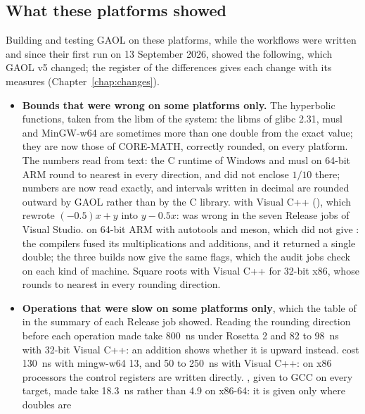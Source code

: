 \documentclass[12pt,a4paper,twoside,openright]{book}
\begin{document}
\endgroup

\subsection{What these platforms showed}\label{sec:ci-showed}

Building and testing GAOL on these platforms, while the workflows were
written and since their first run on 13 September 2026, showed the
following, which GAOL v5 changed; the register of the differences gives each
change with its measures (Chapter~\ref{chap:changes}).

\begin{itemize}
\item[$\bullet$] \textbf{Bounds that were wrong on some platforms only.}
  The hyperbolic functions, taken from the libm of the system: the libms of
  glibc 2.31, musl and MinGW-w64 are sometimes more than one double from the
  exact value; they are now those of CORE-MATH, correctly rounded, on every
  platform.\newinvfive{} The numbers read from text: the C runtime of
  Windows and musl on 64-bit ARM round  to nearest in every
  direction, and  did not enclose $1/10$ there;
  numbers are now read exactly, and intervals written in decimal are
  rounded outward by GAOL rather than by the C library.\newinvfive{}
   with Visual C++ (), which rewrote
  $(-0.5)x+y$ into $y-0.5x$:  was wrong in the
  seven Release jobs of Visual Studio.  on 64-bit ARM with
  autotools and meson, which did not give : the
  compilers fused its multiplications and additions, and it returned a
  single double; the three builds now give the same flags, which the audit
  jobs check on each kind of machine. Square roots with Visual C++ for
  32-bit x86, whose  rounds to nearest in every rounding
  direction.
\item[$\bullet$] \textbf{Operations that were slow on some platforms only},
  which the table of  in the summary of each
  Release job showed. Reading the rounding direction before each operation
  made  take 800~ns under Rosetta 2 and 82 to 98~ns with 32-bit
  Visual C++: an addition shows whether it is upward instead.
   cost 130~ns with mingw-w64 13, and 50 to 250~ns with
  Visual C++: on x86 processors the control registers are written directly.
  , given to GCC on every target, made 
  take 18.3~ns rather than 4.9 on x86-64: it is given only where doubles are

\end{itemize}
\end{document}
